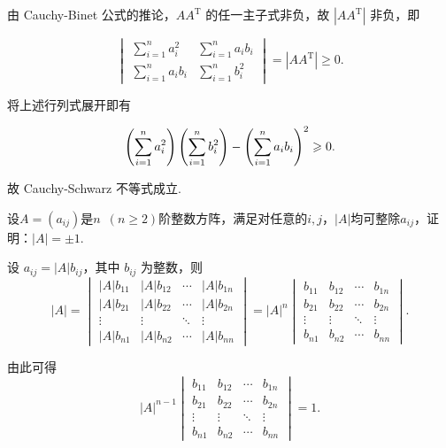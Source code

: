 \begin{exercise}
\begin{exgroup}
\begin{answer}
            由 Cauchy-Binet 公式的推论，$A A^{\mathrm{T}}$ 的任一主子式非负，故 $|AA^\mathrm{T}|$ 非负，即

            \[
                \begin{vmatrix}
                    \sum\limits_{i=1}^{n} a_i^2 & \sum\limits_{i=1}^{n} a_ib_i \\
                    \sum\limits_{i=1}^{n} a_ib_i & \sum\limits_{i=1}^{n} b_i^2
                \end{vmatrix} = |AA^\mathrm{T}| \geqslant 0.
            \]

            将上述行列式展开即有

            \[
                \left( \sum_{i=1}^{n}\limits a_i^2 \right) \left( \sum_{i=1}^{n}\limits b_i^2 \right) - \left( \sum_{i=1}^{n}\limits a_i b_i \right)^2 \geqslant 0.
            \]

            故 Cauchy-Schwarz 不等式成立.
        \end{answer}

        \item 设$A=(a_{ij})$是$n\enspace(n\geqslant 2)$阶整数方阵，满足对任意的$i,j$，$|A|$均可整除$a_{ij}$，证明：$|A|=\pm 1$.
        \begin{answer}
            设 $a_{ij} = |A| b_{ij}$，其中 $b_{ij}$ 为整数，则
            \[
                |A| = \begin{vmatrix}
                    |A| b_{11} & |A| b_{12} & \cdots & |A| b_{1n} \\
                    |A| b_{21} & |A| b_{22} & \cdots & |A| b_{2n} \\
                    \vdots     & \vdots     & \ddots & \vdots     \\
                    |A| b_{n1} & |A| b_{n2} & \cdots & |A| b_{nn}
                \end{vmatrix}
                = |A|^n \begin{vmatrix}
                    b_{11} & b_{12} & \cdots & b_{1n} \\
                    b_{21} & b_{22} & \cdots & b_{2n} \\
                    \vdots & \vdots & \ddots & \vdots \\
                    b_{n1} & b_{n2} & \cdots & b_{nn}
                \end{vmatrix}.
            \]

            由此可得
            \[
                |A|^{n-1} \begin{vmatrix}
                    b_{11} & b_{12} & \cdots & b_{1n} \\
                    b_{21} & b_{22} & \cdots & b_{2n} \\
                    \vdots & \vdots & \ddots & \vdots \\
                    b_{n1} & b_{n2} & \cdots & b_{nn}
                \end{vmatrix} = 1.
            \]


\end{answer}
\end{exgroup}
\end{exercise}
